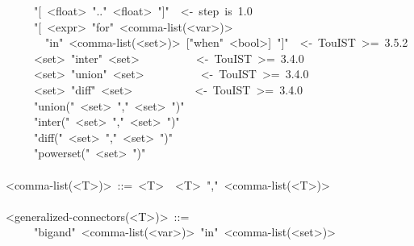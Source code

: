 \begin{mdpre}
~~~~\textbar{}~"{}[~{\textless{}float\textgreater{}}~".."~{\textless{}float\textgreater{}}~"]"~~{\textless{}-~step~is~1.0}\\
~~~~\textbar{}~"{}[~{\textless{}expr\textgreater{}}~"for"~{\textless{}comma-list(\textless{}var\textgreater{})\textgreater{}}\\
~~~~~~~"in"~{\textless{}comma-list(\textless{}set\textgreater{})\textgreater{}}~{}["when"~{\textless{}bool\textgreater{}}]~"]"~~{\textless{}-~TouIST~\textgreater{}=~3.5.2}\\
~~~~\textbar{}~{\textless{}set\textgreater{}}~"inter"~{\textless{}set\textgreater{}}~~~~~~~~~~{\textless{}-~TouIST~\textgreater{}=~3.4.0}\\
~~~~\textbar{}~{\textless{}set\textgreater{}}~"union"~{\textless{}set\textgreater{}}~~~~~~~~~~{\textless{}-~TouIST~\textgreater{}=~3.4.0}\\
~~~~\textbar{}~{\textless{}set\textgreater{}}~"diff"~{\textless{}set\textgreater{}}~~~~~~~~~~~{\textless{}-~TouIST~\textgreater{}=~3.4.0}\\
~~~~\textbar{}~"union("~{\textless{}set\textgreater{}}~","~{\textless{}set\textgreater{}}~")"\\
~~~~\textbar{}~"inter("~{\textless{}set\textgreater{}}~","~{\textless{}set\textgreater{}}~")"\\
~~~~\textbar{}~"diff("~{\textless{}set\textgreater{}}~","~{\textless{}set\textgreater{}}~")"\\
~~~~\textbar{}~"powerset("~{\textless{}set\textgreater{}}~")"\\
\\
{\textless{}comma-list(\textless{}T\textgreater{})\textgreater{}}~::=~{\textless{}T\textgreater{}}~\textbar{}~{\textless{}T\textgreater{}}~","~{\textless{}comma-list(\textless{}T\textgreater{})\textgreater{}}\\
\\
{\textless{}generalized-connectors(\textless{}T\textgreater{})\textgreater{}}~::=\\
~~~~\textbar{}~"bigand"~{\textless{}comma-list(\textless{}var\textgreater{})\textgreater{}}~"in"~{\textless{}comma-list(\textless{}set\textgreater{})\textgreater{}}\\

\end{mdpre}

